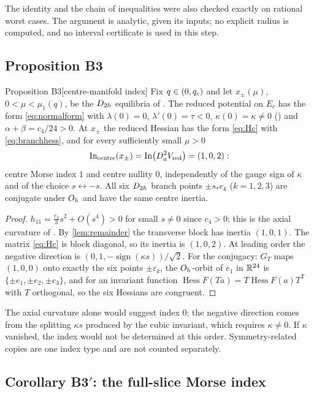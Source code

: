 The identity and the chain of inequalities were also checked exactly on rational worst cases. The argument is analytic,
given its inputs; no explicit radius is computed, and no interval certificate is used in this step.

\subsection{Proposition B3}

\begin{named}{Proposition B3}[centre-manifold index]\label{prop:B3}
Fix $q\in(0,q_{c})$ and let $x_\pm(\mu)$, $0<\mu<\mu_1(q)$, be the $D_{2h}$ equilibria of \propBtwo. The reduced potential
on $E_c$ has the form \eqref{eq:normalform} with $\lambda(0)=0$, $\lambda'(0)=\tau<0$, $\kappa(0)=\kappa\ne0$ (\lemK) and
$\alpha+\beta=c_4/24>0$. At $x_\pm$ the reduced Hessian has the form \eqref{eq:Hc} with \eqref{eq:branchhess}, and for every
sufficiently small $\mu>0$
\[
\operatorname{In}_{\mathrm{centre}}(x_\pm)=\operatorname{In}\bigl(D^2_aV_{\mathrm{red}}\bigr)=(1,0,2):
\]
centre Morse index $1$ and centre nullity $0$, independently of the gauge sign of $\kappa$ and of the choice $s\leftrightarrow-s$.
All six $D_{2h}$ branch points $\pm s_*e_k$ ($k=1,2,3$) are conjugate under $O_{h}$ and have the same centre inertia.
\end{named}

\begin{proof}
$h_{11}=\frac{c_4}{3}s^2+O(s^4)>0$ for small $s\ne0$ since $c_4>0$; this is the axial curvature of \propBtwo. By
\cref{lem:remainder} the transverse block has inertia $(1,0,1)$. The matrix \eqref{eq:Hc} is block diagonal, so its
inertia is $(1,0,2)$. At leading order the negative direction is $(0,1,-\operatorname{sign}(\kappa s))/\sqrt2$. For the
conjugacy: $G_T$ maps $(1,0,0)$ onto exactly the six points $\pm\varepsilon_k$, the $O_{h}$-orbit of $e_1$ in $\mathbb{R}^{24}$ is
$\{\pm e_1,\pm e_2,\pm e_3\}$, and for an invariant function $\operatorname{Hess}F(Ta)=T\operatorname{Hess}F(a)T^{\mathsf T}$
with $T$ orthogonal, so the six Hessians are congruent.
\end{proof}

The axial curvature alone would suggest index $0$; the negative direction comes from the splitting $\kappa s$ produced by the
cubic invariant, which requires $\kappa\ne0$. If $\kappa$ vanished, the index would not be determined at this order.
Symmetry-related copies are one index type and are not counted separately.

\subsection{Corollary B3$'$: the full-slice Morse index}

